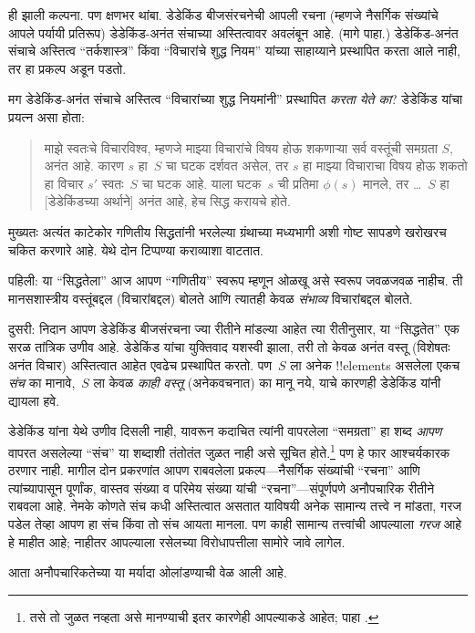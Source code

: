 \documentclass[../../../include/open-logic-section]{subfiles}
\begin{document}
ही झाली कल्पना. पण क्षणभर थांबा. डेडेकिंड बीजसंरचनेची आपली रचना
(म्हणजे नैसर्गिक संख्यांचे आपले पर्यायी प्रतिरूप) डेडेकिंड-अनंत संचाच्या
अस्तित्वावर अवलंबून आहे. (मागे 
पाहा.) डेडेकिंड-अनंत संचाचे अस्तित्व ``तर्कशास्त्र'' किंवा ``विचारांचे
शुद्ध नियम'' यांच्या साहाय्याने प्रस्थापित करता आले नाही, तर हा प्रकल्प
अडून पडतो.

मग डेडेकिंड-अनंत संचाचे अस्तित्व ``विचारांच्या शुद्ध नियमांनी''
प्रस्थापित \emph{करता येते का}? डेडेकिंड यांचा प्रयत्न असा होता:
\begin{quote}
  माझे स्वतःचे विचारविश्व, म्हणजे माझ्या विचारांचे विषय होऊ शकणाऱ्या सर्व
  वस्तूंची समग्रता $S$, अनंत आहे. कारण $s$ हा~$S$ चा घटक दर्शवत असेल,
  तर $s$ हा माझ्या विचाराचा विषय होऊ शकतो हा विचार $s'$ स्वतः~$S$ चा
  घटक आहे. याला घटक~$s$ ची प्रतिमा $\phi(s)$ मानले, तर
  \dots~$S$ हा [डेडेकिंडच्या अर्थाने] अनंत आहे, हेच सिद्ध करायचे होते.
	\citep[\S66]{Dedekind1888}
\end{quote}
मुख्यतः अत्यंत काटेकोर गणितीय सिद्धतांनी भरलेल्या ग्रंथाच्या मध्यभागी
अशी गोष्ट सापडणे खरोखरच चकित करणारे आहे. येथे दोन टिप्पण्या कराव्याशा
वाटतात.

पहिली: या ``सिद्धतेला'' आज आपण ``गणितीय'' स्वरूप म्हणून ओळखू असे स्वरूप
जवळजवळ नाहीच. ती मानसशास्त्रीय वस्तूंबद्दल (विचारांबद्दल) बोलते आणि
त्यातही केवळ \emph{संभाव्य} विचारांबद्दल बोलते.

दुसरी: निदान आपण डेडेकिंड बीजसंरचना ज्या रीतीने मांडल्या आहेत त्या
रीतीनुसार, या ``सिद्धतेत'' एक सरळ तांत्रिक उणीव आहे. डेडेकिंड यांचा
युक्तिवाद यशस्वी झाला, तरी तो केवळ अनंत वस्तू (विशेषतः अनंत विचार)
अस्तित्वात आहेत एवढेच प्रस्थापित करतो. पण~$S$ ला अनेक !!{element}s असलेला
एकच \emph{संच} का मानावे,~$S$ ला केवळ \emph{काही वस्तू} (अनेकवचनात) का मानू
नये, याचे कारणही डेडेकिंड यांनी द्यायला हवे.

डेडेकिंड यांना येथे उणीव दिसली नाही, यावरून कदाचित त्यांनी वापरलेला
``समग्रता'' हा शब्द \emph{आपण} वापरत असलेल्या ``संच'' या शब्दाशी
तंतोतंत जुळत नाही असे सूचित होते.\footnote{तसे तो जुळत नव्हता असे
मानण्याची इतर कारणेही आपल्याकडे आहेत; पाहा \citet[p.~23]{Potter2004}.}
पण हे फार आश्चर्यकारक ठरणार नाही. मागील दोन प्रकरणांत आपण राबवलेला
प्रकल्प---नैसर्गिक संख्यांची ``रचना'' आणि त्यांच्यापासून पूर्णांक,
वास्तव संख्या व परिमेय संख्या यांची ``रचना''---संपूर्णपणे अनौपचारिक
रीतीने राबवला आहे. नेमके कोणते संच कधी अस्तित्वात असतात याविषयी अनेक
सामान्य तत्त्वे न मांडता, गरज पडेल तेव्हा आपण हा संच किंवा तो संच आयता
मानला. पण काही सामान्य तत्त्वांची आपल्याला \emph{गरज} आहे हे माहीत आहे;
नाहीतर आपल्याला रसेलच्या विरोधापत्तीला सामोरे जावे लागेल.

 आता अनौपचारिकतेच्या या मर्यादा ओलांडण्याची वेळ आली आहे.
\end{document}
